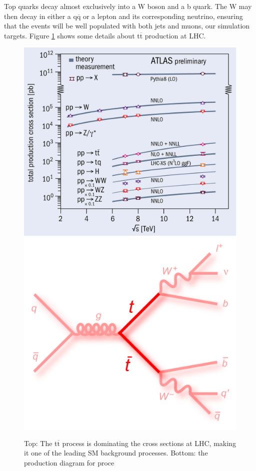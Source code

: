 Top quarks decay almost exclusively into a W boson and a b quark. The W may then decay in either a q$\overline{\text{q}}$ or a lepton and its corresponding neutrino, ensuring that the events will be well populated with both jets and muons, our simulation targets. Figure \ref{fig:ttfig} shows some details about t$\overline{\text{t}}$ production at LHC.

\begin{figure}
    \centering
    \includegraphics[scale=0.2]{gfx/ch5/CCMarApr_LHC10_fig2.jpg}\quad
    \includegraphics[scale=0.3]{gfx/ch5/feynman_ttbar_ljets_longt.png}
    \caption[t$\overline{\text{t}}$ plots]{Top: The t$\overline{\text{t}}$ process is dominating the cross sections at LHC, making it one of the leading SM background processes. Bottom: the production diagram for proce}
    \label{fig:ttfig}
\end{figure}

